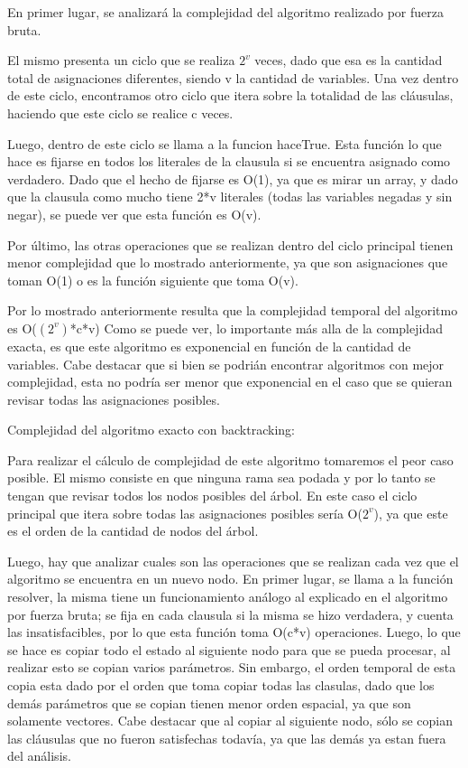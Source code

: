 \documentclass[a4paper,10pt]{article}
\begin{document}
En primer lugar, se analizar\'a la complejidad del algoritmo realizado por fuerza bruta.

El mismo presenta un ciclo que se realiza $2^{v}$ veces, dado que esa es la cantidad total de asignaciones diferentes, siendo v la cantidad de variables. Una vez dentro de este ciclo, encontramos otro ciclo que itera sobre la totalidad de las cl\'ausulas, haciendo que este ciclo se realice c veces. 

Luego, dentro de este ciclo se llama a la funcion haceTrue. Esta funci\'on lo que hace es fijarse en todos los literales de la clausula si se encuentra asignado como verdadero. Dado que el hecho de fijarse es O(1), ya que es mirar un array, y dado que la clausula como mucho tiene 2*v literales (todas las variables negadas y sin negar), se puede ver que esta funci\'on es O(v).

Por \'ultimo, las otras operaciones que se realizan dentro del ciclo principal tienen menor complejidad que lo mostrado anteriormente, ya que son asignaciones que toman O(1) o es la funci\'on siguiente que toma O(v).

Por lo mostrado anteriormente resulta que la complejidad temporal del algoritmo es O($(2^{v})$*c*v)
Como se puede ver, lo importante m\'as alla de la complejidad exacta, es que este algoritmo es exponencial en funci\'on de la cantidad de variables. Cabe destacar que si bien se podri\'an encontrar algoritmos con mejor complejidad, esta no podr\'ia ser menor que exponencial en el caso que se quieran revisar todas las asignaciones posibles.

\bigskip

Complejidad del algoritmo exacto con backtracking:

Para realizar el c\'alculo de complejidad de este algoritmo tomaremos el peor caso posible. El mismo consiste en que ninguna rama sea podada y por lo tanto se tengan que revisar todos los nodos posibles del \'arbol. En este caso el ciclo principal que itera sobre todas las asignaciones posibles ser\'ia O($2^{v}$), ya que este es el orden de la cantidad de nodos del \'arbol. 

Luego, hay que analizar cuales son las operaciones que se realizan cada vez que el algoritmo se encuentra en un nuevo nodo. En primer lugar, se llama a la funci\'on resolver, la misma tiene un funcionamiento an\'alogo al explicado en el algoritmo por fuerza bruta; se fija en cada clausula si la misma se hizo verdadera, y cuenta las insatisfacibles, por lo que esta funci\'on toma O(c*v) operaciones. Luego, lo que se hace es copiar todo el estado al siguiente nodo para que se pueda procesar, al realizar esto se copian varios par\'ametros. Sin embargo, el orden temporal de esta copia esta dado por el orden que toma copiar todas las clasulas, dado que los dem\'as par\'ametros que se copian tienen menor orden espacial, ya que son solamente vectores. Cabe destacar que al copiar al siguiente nodo, s\'olo se copian las cl\'ausulas que no fueron satisfechas todav\'ia, ya que las dem\'as ya estan fuera del an\'alisis.
\end{document}
